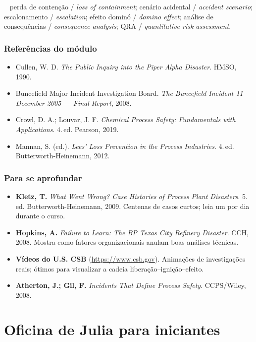 \documentclass[10pt,a4paper,twocolumn,openany]{report}
\newcommand{\lead}[2]{\par\medskip\noindent{\color{#1}\bfseries #2}\ }
\newenvironment{chaves}{\lead{cinza}{Palavras-chave (PT/EN):}\small}{\par}
\newenvironment{refs}{\subsection*{Referências do módulo}\small}{\par}
\newenvironment{aprofundar}{\subsection*{\textcolor{amarelo}{Para se aprofundar}}\small}{\par}
\begin{document}
\begin{chaves}
perda de contenção / \emph{loss of containment}; cenário acidental /
\emph{accident scenario}; escalonamento / \emph{escalation}; efeito dominó /
\emph{domino effect}; análise de consequências / \emph{consequence analysis};
QRA / \emph{quantitative risk assessment}.
\end{chaves}

\begin{refs}
\begin{itemize}
  \item Cullen, W. D. \emph{The Public Inquiry into the Piper Alpha Disaster}. HMSO, 1990.
  \item Buncefield Major Incident Investigation Board. \emph{The Buncefield Incident 11 December 2005 --- Final Report}, 2008.
  \item Crowl, D. A.; Louvar, J. F. \emph{Chemical Process Safety: Fundamentals with Applications}. 4.\,ed. Pearson, 2019.
  \item Mannan, S. (ed.). \emph{Lees' Loss Prevention in the Process Industries}. 4.\,ed. Butterworth-Heinemann, 2012.
\end{itemize}
\end{refs}

\begin{aprofundar}
\begin{itemize}[leftmargin=*]
  \item \textbf{Kletz, T.} \emph{What Went Wrong? Case Histories of Process Plant Disasters}. 5.\,ed. Butterworth-Heinemann, 2009. Centenas de casos curtos; leia um por dia durante o curso.
  \item \textbf{Hopkins, A.} \emph{Failure to Learn: The BP Texas City Refinery Disaster}. CCH, 2008. Mostra como fatores organizacionais anulam boas análises técnicas.
  \item \textbf{Vídeos do U.S. CSB} (\url{https://www.csb.gov}). Animações de investigações reais; ótimos para visualizar a cadeia liberação--ignição--efeito.
  \item \textbf{Atherton, J.; Gil, F.} \emph{Incidents That Define Process Safety}. CCPS/Wiley, 2008.
\end{itemize}
\end{aprofundar}

\renewcommand{\thechapter}{J}
\renewcommand{\theHchapter}{J}
\chapter{Oficina de Julia para iniciantes}
\end{document}
